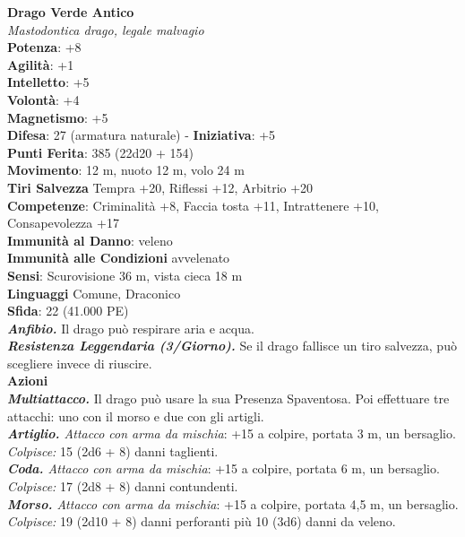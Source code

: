 \begin{multicols}{2}
\medskip\textbf{Drago Verde Antico}\\
\emph{Mastodontica drago, legale malvagio} \\
\textbf{Potenza}: +8\\
\textbf{Agilità}: +1\\
\textbf{Intelletto}: +5\\
\textbf{Volontà}: +4\\
\textbf{Magnetismo}: +5\\
\textbf{Difesa}: 27 (armatura naturale) - \textbf{Iniziativa}: +5\\
\textbf{Punti Ferita}: 385 (22d20 + 154)\\
\textbf{Movimento}: 12 m, nuoto 12 m, volo 24 m\\
\textbf{Tiri Salvezza} Tempra +20, Riflessi +12, Arbitrio +20\\
\textbf{Competenze}: Criminalità +8, Faccia tosta +11, Intrattenere +10, Consapevolezza +17\\
\textbf{Immunità al Danno}: veleno\\
\textbf{Immunità alle Condizioni} avvelenato\\
\textbf{Sensi}: Scurovisione 36 m, vista cieca 18 m\\
\textbf{Linguaggi} Comune, Draconico\\
\textbf{Sfida}: 22 (41.000 PE)\smallskip\\
\emph{\textbf{Anfibio.}} Il drago può respirare aria e acqua.\\
\emph{\textbf{Resistenza Leggendaria (3/Giorno).}} Se il drago fallisce un tiro salvezza, può scegliere invece di riuscire.\\
\smallskip\textbf{Azioni}\\
\emph{\textbf{Multiattacco.}} Il drago può usare la sua Presenza Spaventosa. Poi effettuare tre attacchi: uno con il morso e due con gli artigli.\\
\emph{\textbf{Artiglio.} Attacco con arma da mischia}: +15 a colpire, portata 3 m, un bersaglio.\\
\emph{Colpisce:} 15 (2d6 + 8) danni taglienti.\\
\emph{\textbf{Coda.} Attacco con arma da mischia}: +15 a colpire, portata 6 m, un bersaglio.\\
\emph{Colpisce:} 17 (2d8 + 8) danni contundenti.\\
\emph{\textbf{Morso.} Attacco con arma da mischia}: +15 a colpire, portata 4,5 m, un bersaglio.\\
\emph{Colpisce:} 19 (2d10 + 8) danni perforanti più 10 (3d6) danni da veleno.\\

\end{multicols}
